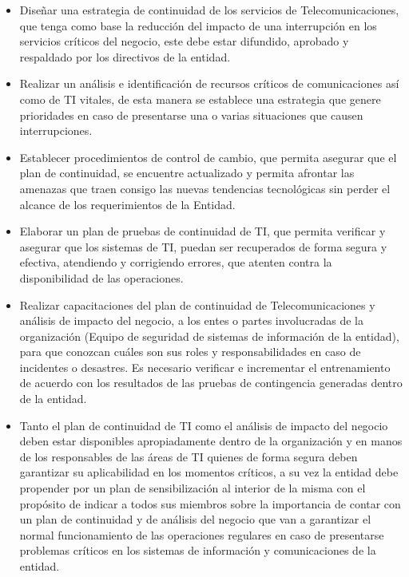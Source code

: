 \documentclass[conference]{IEEEtran}
\begin{document}
\begin{itemize}
    \item Diseñar una estrategia de continuidad de los servicios de Telecomunicaciones, que tenga como base la reducción del impacto de una interrupción en los servicios
críticos del negocio, este debe estar difundido, aprobado y respaldado por los directivos de la entidad.
    \item Realizar un análisis e identificación de recursos críticos de comunicaciones así como de TI vitales, de esta manera se establece una estrategia que genere prioridades en caso de
presentarse una o varias situaciones que causen interrupciones.
    \item Establecer procedimientos de control de cambio, que permita asegurar que
el plan de continuidad, se encuentre actualizado y permita afrontar las
amenazas que traen consigo las nuevas tendencias tecnológicas sin perder
el alcance de los requerimientos de la Entidad.
    \item Elaborar un plan de pruebas de continuidad de TI, que permita verificar y
asegurar que los sistemas de TI, puedan ser recuperados de forma segura y efectiva, atendiendo y corrigiendo errores, que atenten contra la disponibilidad de las operaciones.
    \item Realizar capacitaciones del plan de continuidad de Telecomunicaciones y análisis de impacto del negocio, a los entes o partes involucradas de la organización (Equipo de
seguridad de sistemas de información de la entidad), para que conozcan cuáles son sus roles y responsabilidades en caso de incidentes o desastres. Es necesario verificar e incrementar el entrenamiento de acuerdo con los resultados de las pruebas de contingencia generadas
dentro de la entidad.
    \item Tanto el plan de continuidad de TI como el análisis de impacto del negocio
deben estar disponibles apropiadamente dentro de la organización y en manos de los responsables de las áreas de TI quienes de forma segura deben garantizar su aplicabilidad en los momentos críticos, a su vez la entidad debe propender por un plan de sensibilización al interior de la
misma con el propósito de indicar a todos sus miembros sobre la importancia de contar con un plan de continuidad y de análisis del negocio que van a garantizar el normal funcionamiento de las operaciones regulares en caso de presentarse problemas críticos en los sistemas de información y comunicaciones de la entidad.
\end{itemize}
\end{document}
